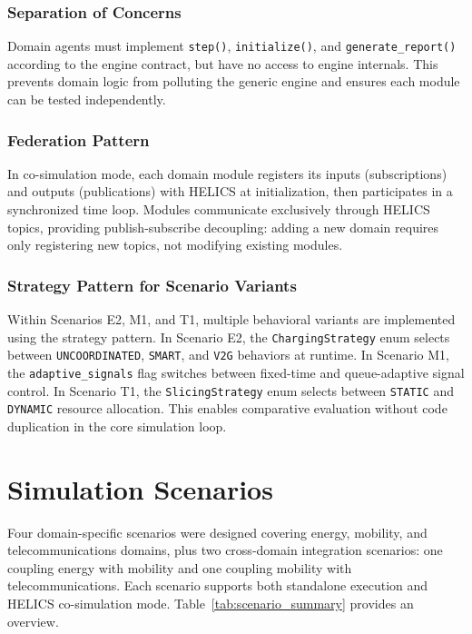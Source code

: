 \subsubsection{Separation of Concerns}

Domain agents must implement \texttt{step()}, \texttt{initialize()}, and \texttt{generate\_report()} according to the engine contract, but have no access to engine internals. This prevents domain logic from polluting the generic engine and ensures each module can be tested independently.

\subsubsection{Federation Pattern}

In co-simulation mode, each domain module registers its inputs (subscriptions) and outputs (publications) with HELICS at initialization, then participates in a synchronized time loop. Modules communicate exclusively through HELICS topics, providing publish-subscribe decoupling: adding a new domain requires only registering new topics, not modifying existing modules.

\subsubsection{Strategy Pattern for Scenario Variants}

Within Scenarios E2, M1, and T1, multiple behavioral variants are implemented using the strategy pattern. In Scenario E2, the \texttt{ChargingStrategy} enum selects between \texttt{UNCOORDINATED}, \texttt{SMART}, and \texttt{V2G} behaviors at runtime. In Scenario M1, the \texttt{adaptive\_signals} flag switches between fixed-time and queue-adaptive signal control. In Scenario T1, the \texttt{SlicingStrategy} enum selects between \texttt{STATIC} and \texttt{DYNAMIC} resource allocation. This enables comparative evaluation without code duplication in the core simulation loop.


\section{Simulation Scenarios}
\label{sec:sim-scenarios}

Four domain-specific scenarios were designed covering energy, mobility, and telecommunications domains, plus two cross-domain integration scenarios: one coupling energy with mobility and one coupling mobility with telecommunications. Each scenario supports both standalone execution and HELICS co-simulation mode. Table~\ref{tab:scenario_summary} provides an overview.

